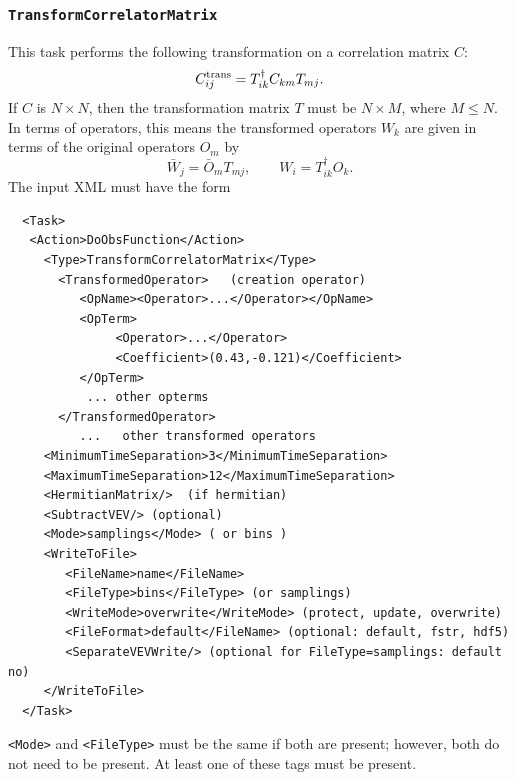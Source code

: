 \documentclass[12pt]{article}
\newcommand{\vb}{\texttt}
\begin{document}
\subsubsection{\vb{TransformCorrelatorMatrix}}
This task performs the following transformation on a correlation matrix $C$:
\[
  C^{\rm trans}_{ij} = T^\dagger_{ik} C_{km} T_{mj}.
\]
If $C$ is $N\times N$, then the transformation matrix $T$ must be 
$N\times M$, where $M \leq N$.  In terms of operators, this means the 
transformed operators $W_k$ are given in terms of the original operators
$O_m$ by
\[   \bar{W}_j = \bar{O}_m T_{mj},\qquad 
                   W_i = T^\dagger_{ik} O_k.
\]
The input XML must have the form
\begin{verbatim}
  <Task>
   <Action>DoObsFunction</Action>
     <Type>TransformCorrelatorMatrix</Type>              
       <TransformedOperator>   (creation operator)       
          <OpName><Operator>...</Operator></OpName>      
          <OpTerm>                                       
               <Operator>...</Operator>                  
               <Coefficient>(0.43,-0.121)</Coefficient>  
          </OpTerm>                                      
           ... other opterms                             
       </TransformedOperator>                            
          ...   other transformed operators              
     <MinimumTimeSeparation>3</MinimumTimeSeparation>    
     <MaximumTimeSeparation>12</MaximumTimeSeparation>   
     <HermitianMatrix/>  (if hermitian)                  
     <SubtractVEV/> (optional)                           
     <Mode>samplings</Mode> ( or bins )
     <WriteToFile>                                       
        <FileName>name</FileName>                        
        <FileType>bins</FileType> (or samplings)         
        <WriteMode>overwrite</WriteMode> (protect, update, overwrite)    
        <FileFormat>default</FileName> (optional: default, fstr, hdf5)
        <SeparateVEVWrite/> (optional for FileType=samplings: default no)
     </WriteToFile> 
  </Task>
\end{verbatim}
\vb{<Mode>} and \vb{<FileType>} must be the same if both are present;
however, both do not need to be present.  At least one of these tags must 
be present.
\end{document}
